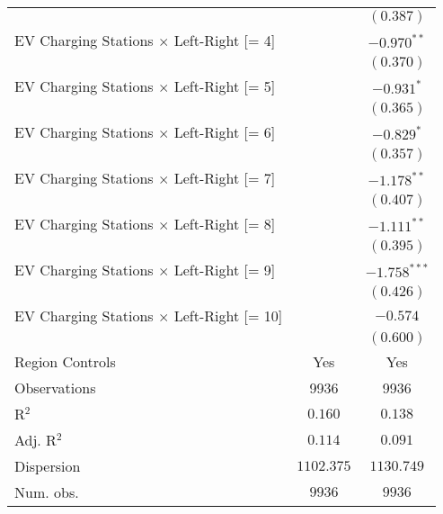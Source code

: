 \begin{center}
\begin{tiny}
\begin{longtable}{l@{} c@{} c@{}}
                                                         &                  & $(0.387)$        \\
\quad EV Charging Stations $\times$ Left-Right [= 4]     &                  & $-0.970^{**}$    \\
                                                         &                  & $(0.370)$        \\
\quad EV Charging Stations $\times$ Left-Right [= 5]     &                  & $-0.931^{*}$     \\
                                                         &                  & $(0.365)$        \\
\quad EV Charging Stations $\times$ Left-Right [= 6]     &                  & $-0.829^{*}$     \\
                                                         &                  & $(0.357)$        \\
\quad EV Charging Stations $\times$ Left-Right [= 7]     &                  & $-1.178^{**}$    \\
                                                         &                  & $(0.407)$        \\
\quad EV Charging Stations $\times$ Left-Right [= 8]     &                  & $-1.111^{**}$    \\
                                                         &                  & $(0.395)$        \\
\quad EV Charging Stations $\times$ Left-Right [= 9]     &                  & $-1.758^{***}$   \\
                                                         &                  & $(0.426)$        \\
\quad EV Charging Stations $\times$ Left-Right [= 10]    &                  & $-0.574$         \\
                                                         &                  & $(0.600)$        \\
\hline
Region Controls                                          & Yes              & Yes              \\
Observations                                             & 9936             & 9936             \\
R$^2$                                                    & $0.160$          & $0.138$          \\
Adj. R$^2$                                               & $0.114$          & $0.091$          \\
Dispersion                                               & $1102.375$       & $1130.749$       \\
Num. obs.                                                & $9936$           & $9936$           \\
\end{longtable}
\end{tiny}
\end{center}
